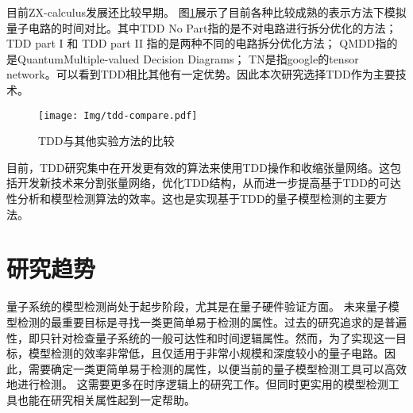 目前ZX-calculus发展还比较早期。
图\ref{fig:tdd-compare}展示了目前各种比较成熟的表示方法下模拟量子电路的时间对比。其中TDD No Part指的是不对电路进行拆分优化的方法；TDD part I 和 TDD part II 指的是两种不同的电路拆分优化方法；
QMDD指的是QuantumMultiple-valued Decision Diagrams；
TN是指google的tensor network。可以看到TDD相比其他有一定优势。因此本次研究选择TDD作为主要技术。

\begin{figure}[!htbp]
    \centering
    \texttt{[image: Img/tdd-compare.pdf]}
    \caption{TDD与其他实验方法的比较\citep{Hong_2022}}
    \label{fig:tdd-compare}
\end{figure}

目前，TDD研究集中在开发更有效的算法来使用TDD操作和收缩张量网络。这包括开发新技术来分割张量网络，优化TDD结构，从而进一步提高基于TDD的可达性分析和模型检测算法的效率。这也是实现基于TDD的量子模型检测的主要方法。
\section{研究趋势}
量子系统的模型检测尚处于起步阶段，尤其是在量子硬件验证方面。
未来量子模型检测的最重要目标是寻找一类更简单易于检测的属性。过去的研究追求的是普遍性，即只针对检查量子系统的一般可达性和时间逻辑属性。然而，为了实现这一目标，模型检测的效率非常低，且仅适用于非常小规模和深度较小的量子电路。因此，需要确定一类更简单易于检测的属性，以便当前的量子模型检测工具可以高效地进行检测\citep{ying2021model}。
这需要更多在时序逻辑上的研究工作。但同时更实用的模型检测工具也能在研究相关属性起到一定帮助。